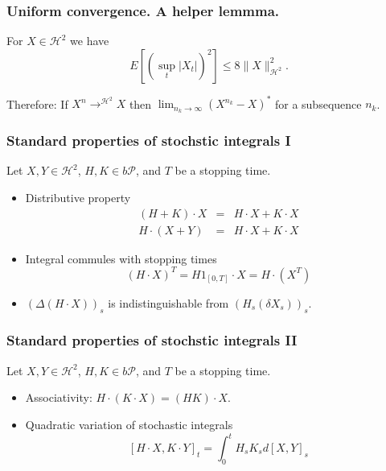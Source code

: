 


\begin{frame}
    \frametitle{Uniform convergence. A helper lemmma.}
     

    For $X \in \mathcal H^2$ we have
    \begin{equation}
        E\left[ (\sup_t |X_t|)^2 \right] \leq 8 \| X \|^2_{\mathcal H^2}.
        \label{}
    \end{equation}

    Therefore: If $X^n \to^{\mathcal H^2} X$ then $\lim_{n_k\to \infty} \left( X^{n_k} - X \right)^{*}$ for a subsequence $n_k$.

\end{frame}



\begin{frame}
    \frametitle{Standard properties of stochstic integrals I}

    Let $X,Y \in \mathcal H^2$, $H,K \in b\mathcal P$, and $T$ be a stopping time. 
    \begin{itemize}
        \item Distributive property \begin{eqnarray}
                \left( H+K \right) \cdot X &=& H \cdot X + K \cdot X \\
                H \cdot \left( X + Y \right) &=&  H \cdot X  + K \cdot X
            \end{eqnarray}
        \item Integral commules with stopping times
            \begin{equation}
                \left( H \cdot X \right)^T = H 1_{\left[ 0,T \right]} \cdot X = H \cdot \left( X^T \right)
            \end{equation}
        \item $\left( \Delta\left( H \cdot X \right) \right)_s$ 
            is indistinguishable from $\left( H_s\left( \delta X_s \right) \right)_s$.
    \end{itemize}
\end{frame}

\begin{frame}
    \frametitle{Standard properties of stochstic integrals II}

    Let $X,Y \in \mathcal H^2$, $H,K \in b\mathcal P$, and $T$ be a stopping time. 
    \begin{itemize}
        \item Associativity: $H \cdot \left( K \cdot X \right) = \left( HK \right) \cdot X$.
        \item Quadratic variation of stochastic integrals
            \begin{equation}
                \left[ H \cdot X, K \cdot Y \right]_t = \int_{0}^{t} H_s K_s d\left[ X,Y \right]_s
            \end{equation}
    \end{itemize}
\end{frame}




